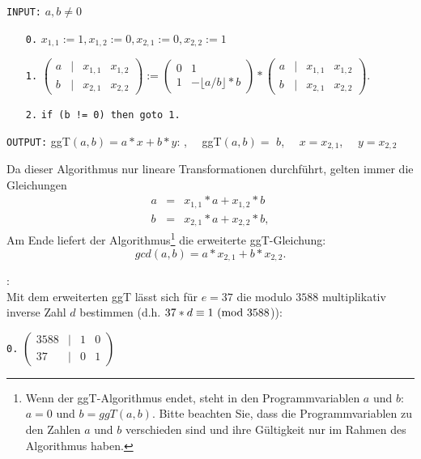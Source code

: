 \begin{refsegment}
\newpage
 {\tt INPUT:} $a,b \not= 0$
\begin{itemize}
  \item[\tt 0.] $x_{1,1} := 1, x_{1,2} := 0, x_{2,1} := 0, x_{2,2} := 1$
  \item[\tt 1.] $ \left(\begin{array}{cccc} a & | & x_{1,1} & x_{1,2} \\ b & | & x_{2,1} & x_{2,2} \end{array} \right) :=
           \left(\begin{array}{cc} 0 & 1  \\ 1 & - \lfloor a/b \rfloor * b \end{array} \right)*
           \left(\begin{array}{cccc} a & | & x_{1,1} & x_{1,2} \\ b & | & x_{2,1} & x_{2,2} \end{array} \right).$
  \item[\tt 2.] {\tt if (b != 0) then goto 1.}
\end{itemize}

{\tt OUTPUT:} \glqq ggT$(a,b) = a*x +b*y$: \grqq,~~ \glqq ggT$(a,b) =$ \grqq $b$,~~
                       \glqq $x = $\grqq $x_{2,1}$,~~ \glqq $y = $\grqq $x_{2,2}$

 Da dieser Algorithmus nur lineare Transformationen durchführt, gelten immer die Gleichungen
\begin{eqnarray*}
 a & = & x_{1,1}*a + x_{1,2}*b \nonumber\\
 b & = & x_{2,1}*a + x_{2,2}*b, \nonumber
\end{eqnarray*}
Am Ende liefert der Algorithmus\footnote{%
Wenn der ggT-Algorithmus endet, steht in den Programmvariablen $a$ und $b$:
$a = 0$ und $b=ggT(a,b)$. Bitte beachten Sie, dass die Programmvariablen zu den Zahlen
$a$ und $b$ verschieden sind und ihre Gültigkeit nur im Rahmen des Algorithmus haben.
} die erweiterte ggT-Gleichung:
$$gcd(a,b) = a*x_{2,1} + b*x_{2,2}.$$

\begin{example}{:}\\
Mit dem erweiterten ggT lässt sich für $e = 37$ die modulo $3588$ multiplikativ inverse Zahl
$d$ bestimmen (d.h. $37*d \equiv 1 {\rm ~(mod~} 3588$)):

{\tt 0.}
 $ \left(\begin{array}{cccc} 3588 & | & 1 & 0 \\ 37 & | & 0 & 1 \end{array} \right)$


\end{example}
\end{refsegment}
